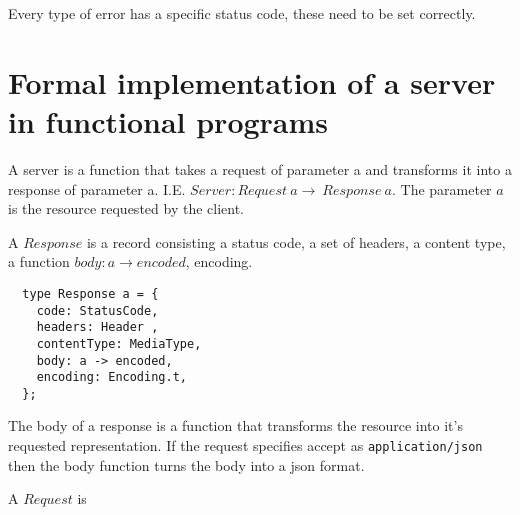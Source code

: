 Every type of error has a specific status code, these need to be set correctly.

\section{Formal implementation of a server in functional programs}

A server is a function that takes a request of parameter a and transforms it
into a response of parameter a. I.E.  $Server : Request\ a\rightarrow\ Response\
a$. The parameter $a$ is the resource requested by the client.

A $Response$ is a record consisting a status code, a set of headers, a
content type, a function $body: a\rightarrow encoded$, encoding.

\begin{lstlisting}
  type Response a = {
    code: StatusCode,
    headers: Header ,
    contentType: MediaType,
    body: a -> encoded,
    encoding: Encoding.t,
  };
\end{lstlisting}

The body of a response is a function that transforms the resource into it's
requested representation. If the request specifies accept as
\lstinline{application/json} then the body function turns the body into a json
format. 

A $Request$ is 
